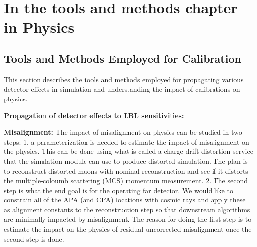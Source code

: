 \chapter{In the tools and methods chapter in Physics}
\section{Tools and Methods Employed for Calibration }
\label{sec:phys-tools-calib}


This section describes the tools and methods employed for propagating various detector effects in simulation and understanding the impact of calibrations on physics. 

\textbf{Propagation of detector effects to LBL sensitivities:} 

\textbf{Misalignment:} The impact of misalignment on physics can be studied in two steps: 1. a parameterization is needed to estimate the impact of misalignment on the physics. This can be done using what is called a charge drift distortion service that the simulation module can use to produce distorted simulation. The plan is to reconstruct distorted muons with nominal reconstruction and see if it distorts the multiple-coloumb scattering (MCS) momentum measurement. 2. The second step is what the end goal is for the operating far detector. We would like to constrain
all of the APA (and CPA) locations with cosmic rays and apply these as alignment constants to the
reconstruction step so that downstream algorithms are minimally impacted by misalignment. The reason for doing the first step is to estimate the impact on the physics of residual uncorrected misalignment once the second step is done.

